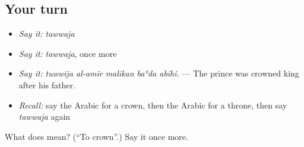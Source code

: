 \subsection*{Your turn}
\begin{itemize}
\raggedright
  \item \emph{Say it:} \emph{tawwaja}
  \item \emph{Say it:} \emph{tawwaja}, once more
  \item \emph{Say it:} \emph{tuwwija al-amīr malikan baʿda abīhi.} — The prince was crowned king after his father.
  \item \emph{Recall:} say the Arabic for a crown, then the Arabic for a throne, then say \emph{tawwaja} again
\end{itemize}

\begin{tcolorbox}[breakable,colback=teal!4,colframe=teal!35!black,title={Before you move on}]
What does  mean? (\textquotedblleft{}To crown\textquotedblright{}.) Say it once more.
\end{tcolorbox}
